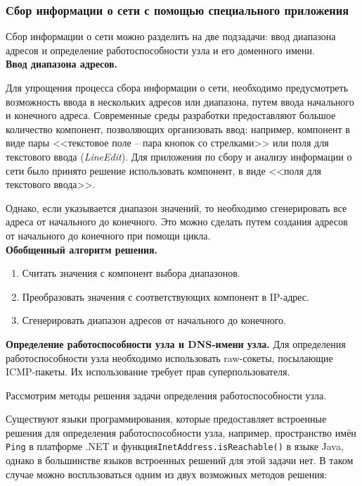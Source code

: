 \documentclass[a4paper]{article}
\begin{document}
		\subsubsection{Сбор информации о сети с помощью специального приложения}

			Сбор информации о сети можно разделить на две подзадачи: ввод диапазона адресов и определение работоспособности узла и его доменного имени.\\
			
			\textbf{Ввод диапазона адресов.}
			
			Для упрощения процесса сбора информации о сети, необходимо предусмотреть возможность ввода в нескольких адресов или диапазона, путем ввода начального и конечного адреса. Современные среды разработки предоставляют большое количество компонент, позволяющих организовать ввод: например, компонент в виде пары <<текстовое поле -- пара кнопок со стрелками>> или поля для текстового ввода (\emph{LineEdit}). Для приложения по сбору и анализу информации о сети было принято решение использовать компонент, в виде <<поля для текстового ввода>>.
			
			Однако, если указывается диапазон значений, то необходимо сгенерировать все адреса от начального до конечного. Это можно сделать путем создания адресов от начального до конечного при помощи цикла.\\

			\textbf{Обобщенный алгоритм решения.}
			
			\begin{enumerate}
				\item Считать значения с компонент выбора диапазонов.
				\item Преобразовать значения с соответствующих компонент в IP-адрес.
				\item Сгенерировать диапазон адресов от начального до конечного.				
			\end{enumerate}
			
			\textbf{Определение работоспособности узла и DNS-имени узла.} Для определения работоспособности узла необходимо использовать raw-сокеты, посылающие ICMP-пакеты. Их использование требует прав суперпользователя.
			
			Рассмотрим методы решения задачи определения работоспособности узла. 
			
			Существуют языки программирования, которые предоставляет встроенные решения для определения работоспособности узла, например, пространство имён \texttt{Ping} в платформе .NET и функция\texttt{InetAddress.isReachable()} в языке Java, однако в большинстве языков встроенных решений для этой задачи нет. В таком случае можно воспльзоваться одним из двух возможных методов решения: 
			
\end{document}
